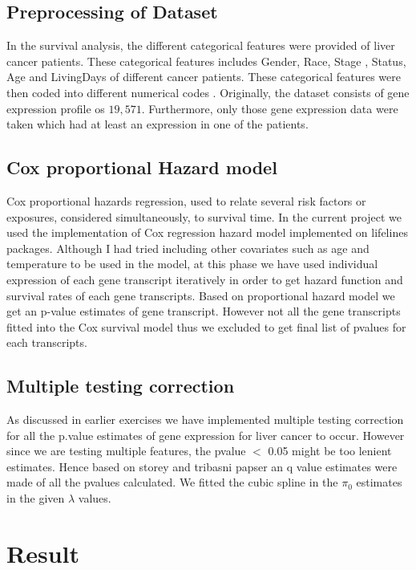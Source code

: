 \documentclass[a4paper,9pt]{article}
\begin{document}
	\subsection {Preprocessing of Dataset}
In the survival analysis, the different categorical features were provided of liver cancer patients. These categorical features includes Gender, Race, Stage , Status, Age and LivingDays of different cancer patients.  These categorical features were then coded into different numerical codes . Originally, the dataset consists of gene expression profile os $19,571$. Furthermore, only those gene expression data were taken which had at least an expression in one of the patients.  

	\subsection{Cox proportional Hazard model}
	 Cox proportional hazards regression, used to relate several risk factors or exposures, considered simultaneously, to survival time. In the current project we used the implementation of Cox regression hazard model implemented on lifelines packages. Although I had tried including other covariates such as age and temperature to be used in the model, at this phase we have used individual expression of each gene transcript iteratively in order to get hazard function and survival rates of each gene transcripts. Based on proportional hazard model we get an p-value estimates of gene transcript. However not all the gene transcripts fitted into the Cox survival model thus we excluded to get final list of pvalues for each transcripts.
	 
	\subsection {Multiple testing correction}
	As discussed in earlier exercises we have  implemented multiple testing correction for all the p.value estimates of gene expression for liver cancer to occur. However since we are testing multiple features, the pvalue $<$ 0.05 might be too lenient estimates. Hence based on storey and tribasni papser \cite {} an q value estimates were made of all the pvalues calculated. We fitted the cubic spline in the $\pi_0$ estimates in the given  $\lambda$ values.
	 


 \section{Result}
 
\end{document}
